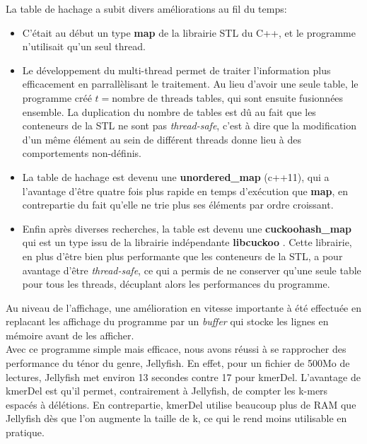\documentclass{report}
\begin{document}
    La table de hachage a subit divers améliorations au fil du temps:\\
    \begin{itemize}
      \item C'était au début un type \textbf{map} de la librairie STL du C++, et le programme n'utilisait qu'un seul thread.
      \item Le développement du multi-thread permet de traiter l'information plus efficacement en parrallèlisant le traitement. Au lieu d'avoir une seule table, le programme créé $t = \text{nombre de threads}$ tables, qui sont ensuite fusionnées ensemble. La duplication du nombre de tables est dû au fait que les conteneurs de la STL ne sont pas \textit{thread-safe}, c'est à dire que la modification d'un même élément au sein de différent threads donne lieu à des comportements non-définis.
      \item La table de hachage est devenu une \textbf{unordered\_map} (c++11), qui a l'avantage d'être quatre fois plus rapide en temps d'exécution que \textbf{map}, en contrepartie du fait qu'elle ne trie plus ses éléments par ordre croissant.
      \item Enfin après diverses recherches, la table est devenu une \textbf{cuckoohash\_map} qui est un type issu de la librairie indépendante \textbf{libcuckoo} \cite{Cuckoo2013} \cite{Cuckoo2014}. Cette librairie, en plus d'être bien plus performante que les conteneurs de la STL, a pour avantage d'être \textit{thread-safe}, ce qui a permis de ne conserver qu'une seule table pour tous les threads, décuplant alors les performances du programme.
    \end{itemize}\bigskip

    Au niveau de l'affichage, une amélioration en vitesse importante à été effectuée en replacant les affichage du programme par un \textit{buffer} qui stocke les lignes en mémoire avant de les afficher.\\

    Avec ce programme simple mais efficace, nous avons réussi à se rapprocher des performance du ténor du genre, Jellyfish. En effet, pour un fichier de 500Mo de lectures, Jellyfish met environ 13 secondes contre 17 pour kmerDel. L'avantage de kmerDel est qu'il permet, contrairement à Jellyfish, de compter les k-mers espacés à délétions. En contrepartie, kmerDel utilise beaucoup plus de RAM que Jellyfish dès que l'on augmente la taille de k, ce qui le rend moins utilisable en pratique.
    \newpage
\end{document}
